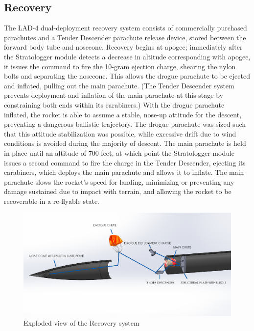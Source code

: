 \subsection{Recovery}
The LAD-4 dual-deployment recovery system consists of commercially purchased parachutes and a Tender Descender parachute release device, stored between the forward body tube and nosecone. Recovery begins at apogee; immediately after the Stratologger module detects a decrease in altitude corresponding with apogee, it issues the command to fire the 10-gram ejection charge, shearing the nylon bolts and separating the nosecone. This allows the drogue parachute to be ejected and inflated, pulling out the main parachute. (The Tender Descender system prevents deployment and inflation of the main parachute at this stage by constraining both ends within its carabiners.) With the drogue parachute inflated, the rocket is able to assume a stable, nose-up attitude for the descent, preventing a dangerous ballistic trajectory. The drogue parachute was sized such that this attitude stabilization was possible, while excessive drift due to wind conditions is avoided during the majority of descent. 
\newline\newline
The main parachute is held in place until an altitude of 700 feet, at which point the Stratologger module issues a second command to fire the charge in the Tender Descender, ejecting its carabiners, which deploys the main parachute and allows it to inflate. The main parachute slows the rocket’s speed for landing, minimizing or preventing any damage sustained due to impact with terrain, and allowing the rocket to be recoverable in a re-flyable state.
\begin{figure}[H]
    \centering
    \includegraphics[scale=0.4]{imgs/recoverydetail.png}
    \caption{Exploded view of the Recovery system}
    \label{fig:recovery}
\end{figure}

